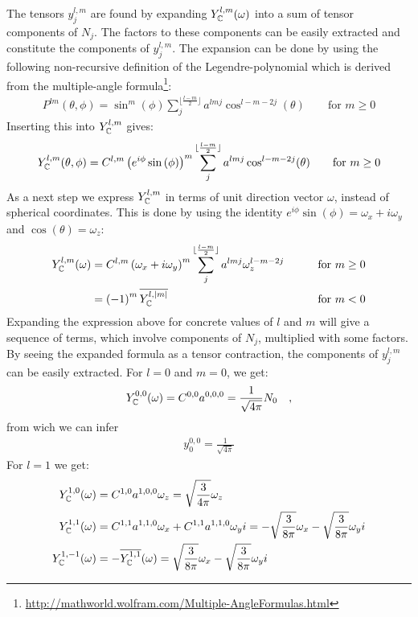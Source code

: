 The tensors $y^{l,m}_j$ are found by expanding $Y_{\mathbb{C}}^{l,m}(\omega)$ into a sum of tensor components of $N_j$. The factors to these components can be easily extracted and constitute the components of $y^{l,m}_j$. The expansion can be done by using the following non-recursive definition of the Legendre-polynomial which is derived from the multiple-angle formula\footnote{\url{http://mathworld.wolfram.com/Multiple-AngleFormulas.html}}:
\begin{align}
P^{lm}(\theta, \phi) = \operatorname{sin}^m(\phi)\sum_j^{\lfloor\frac{l-m}{2}\rfloor}a^{lmj}\operatorname{cos}^{l-m-2j}(\theta)
\qquad \text{for } m \ge 0
\end{align}
Inserting this into $Y_{\mathbb{C}}^{l,m}$ gives:
\begin{align}
Y_{\mathbb{C}}^{l,m}(\theta, \phi) = C^{l,m}\left(e^{i\phi}\operatorname{sin}\left(\phi\right)\right)^m \sum_j^{\lfloor\frac{l-m}{2}\rfloor}a^{lmj}\operatorname{cos}^{l-m-2j}(\theta)
\qquad \text{for } m \ge 0
\end{align}
As a next step we express $Y_{\mathbb{C}}^{l,m}$ in terms of unit direction vector $\omega$, instead of spherical coordinates. This is done by using the identity $e^{i\phi}\operatorname{sin}\left(\phi\right) = \omega_x + i\omega_y$ and $\operatorname{cos}(\theta) = \omega_z$:
\begin{align}
Y_{\mathbb{C}}^{l,m}(\omega) &=  C^{l,m}\left( \omega_x + i\omega_y\right)^m \sum_j^{\lfloor\frac{l-m}{2}\rfloor}a^{lmj}\omega_z^{l-m-2j}
&\qquad \text{for } m \ge 0
\\
&= \left(-1\right)^m\overline{Y_{\mathbb{C}}^{l,\left\vert m\right\vert}}
&\qquad \text{for } m < 0
\end{align}
Expanding the expression above for concrete values of $l$ and $m$ will give a sequence of terms, which involve components of $N_j$, multiplied with some factors. By seeing the expanded formula as a tensor contraction, the components of $y^{l,m}_j$ can be easily extracted. For $l=0$ and $m=0$, we get:
\begin{align}
Y_{\mathbb{C}}^{0,0}(\omega) = C^{{0,0}}a^{{0,0,0}} = \frac{1}{\sqrt{4\pi}}N_0\quad,
\end{align}
from wich we can infer
\begin{align}
y^{0,0}_0 = \frac{1}{\sqrt{4\pi}}
\end{align}
For $l=1$ we get:
\begin{align}
Y_{\mathbb{C}}^{1,0}(\omega) &= C^{{1,0}}a^{{1,0,0}}\omega_z = \sqrt{\frac{3}{4\pi}}\omega_z
\\
Y_{\mathbb{C}}^{1,1}(\omega) &= C^{{1,1}}a^{{1,1,0}}\omega_x+C^{{1,1}}a^{{1,1,0}}\omega_yi = -\sqrt{\frac{3}{8\pi}}\omega_x - \sqrt{\frac{3}{8\pi}}\omega_yi
\\
Y_{\mathbb{C}}^{1,-1}(\omega) &= -\overline{Y_{\mathbb{C}}^{1,1}}(\omega)
= \sqrt{\frac{3}{8\pi}}\omega_x - \sqrt{\frac{3}{8\pi}}\omega_yi
\end{align}
